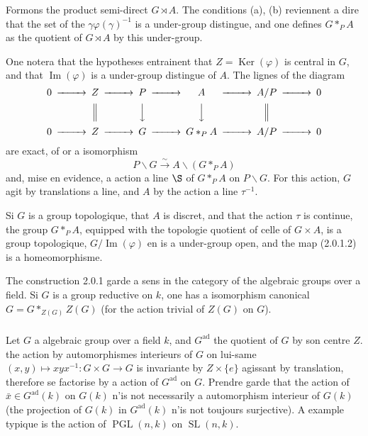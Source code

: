 \documentclass[12pt,a4paper]{article}
\theoremstyle{plain}
\theoremstyle{definition}
\theoremstyle{remark}
\DeclareMathOperator{\SL}{SL}
\DeclareMathOperator{\PGL}{PGL}
\DeclareMathOperator{\Ker}{Ker}
\DeclareMathOperator{\Image}{Im}
\newcommand{\simto}{\xrightarrow{\sim}}
\begin{document}
Formons the product semi-direct $G \rtimes A$. The conditions (a), (b) reviennent a dire that the set of the $\gamma \varphi(\gamma)^{-1}$ is a under-group distingue, and one defines $G *_P A$ as the quotient of $G \rtimes A$ by this under-group.

One notera that the hypotheses entrainent that $Z = \Ker(\varphi)$ is central in $G$, and that $\Image(\varphi)$ is a under-group distingue of $A$. The lignes of the diagram
\begin{equation}\label{eq:2.0.1.1}
\begin{CD}
0 @>>> Z @>>> P @>>> A @>>> A/P @>>> 0 \\
@. @| @VVV @VVV @| \\
0 @>>> Z @>>> G @>>> G *_P A @>>> A/P @>>> 0
\end{CD}
\end{equation}
are exact, of or a isomorphism
\begin{equation}\label{eq:2.0.1.2}
P\backslash G \simto A\backslash(G *_P A)
\end{equation}
and, mise en evidence, a action a line $\S$ of $G *_P A$ on $P\backslash G$. For this action, $G$ agit by translations a line, and $A$ by the action a line $\tau^{-1}$.

Si $G$ is a group topologique, that $A$ is discret, and that the action $\tau$ is continue, the group $G *_P A$, equipped with the topologie quotient of celle of $G \times A$, is a group topologique, $G/\Image(\varphi)$ en is a under-group open, and the map (2.0.1.2) is a homeomorphisme.

The construction 2.0.1 garde a sens in the category of the algebraic groups over a field. Si $G$ is a group reductive on $k$, one has a isomorphism canonical $G = G *_{Z(G)} Z(G)$ (for the action trivial of $Z(G)$ on $G$).

\subsubsection{}

Let $G$ a algebraic group over a field $k$, and $G^{\text{ad}}$ the quotient of $G$ by son centre $Z$. the action by automorphismes interieurs of $G$ on lui-same $(x,y) \mapsto xyx^{-1}: G \times G \to G$ is invariante by $Z \times \{e\}$ agissant by translation, therefore se factorise by a action of $G^{\text{ad}}$ on $G$. Prendre garde that the action of $\bar{x} \in G^{\text{ad}}(k)$ on $G(k)$ n'is not necessarily a automorphism interieur of $G(k)$ (the projection of $G(k)$ in $G^{\text{ad}}(k)$ n'is not toujours surjective). A example typique is the action of $\PGL(n,k)$ on $\SL(n,k)$.
\end{document}
